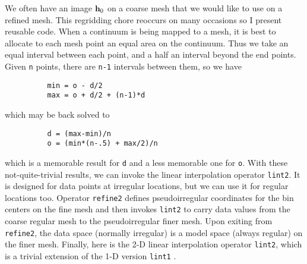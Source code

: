 \par
We often have an image $\bold h_0$
on a coarse mesh that we would like to use on a refined mesh.
This regridding chore reoccurs on many occasions
so I present reusable code.
When a continuum is being mapped to a mesh,
it is best to allocate to each mesh point
an equal area on the continuum.
Thus we take an equal interval between each point,
and a half an interval beyond the end points.
Given {\tt n} points,
there are {\tt n-1} intervals between them,
so we have
\par\noindent\begin{verbatim}
          min = o - d/2
          max = o + d/2 + (n-1)*d
\end{verbatim}
\par\noindent
which may be back solved to
\par\noindent\begin{verbatim}
          d = (max-min)/n
          o = (min*(n-.5) + max/2)/n
\end{verbatim}
\par\noindent
which is a memorable result for {\tt d} and a less memorable one for {\tt o}.
With these not-quite-trivial results, we can invoke
the linear interpolation operator \texttt{lint2}.
It is designed for data points at irregular locations,
but we can use it for regular locations too.
Operator \texttt{refine2} defines pseudoirregular coordinates
for the bin centers on the fine mesh
and then invokes \texttt{lint2} to
carry data values from the coarse regular mesh to
the pseudoirregular finer mesh.
Upon exiting from \texttt{refine2},
the data space (normally irregular)
is a model space (always regular) on the finer mesh.
Finally, here is the 2-D linear interpolation operator \texttt{lint2},
which is a trivial extension of the 1-D version \texttt{lint1} .

